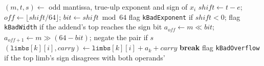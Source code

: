 \documentclass[varwidth=6.2in,border=3pt]{standalone}
\newcommand{\code}[1]{\texttt{#1}}
\begin{document}
\begin{algorithmic}[1]
  \State $(m, t, s) \gets$ odd mantissa, true-ulp exponent and sign of $x_i$ 
  \State $\mathit{shift} \gets t - e$;\; $\mathit{off} \gets \lfloor \mathit{shift}/64 \rfloor$;\; $\mathit{bit} \gets \mathit{shift} \bmod 64$
  \State flag \code{kBadExponent} if $\mathit{shift} < 0$; flag \code{kBadWidth} if the addend's top reaches the sign bit
  \State $a_{\mathit{off}} \gets m \ll \mathit{bit}$;\; $a_{\mathit{off}+1} \gets m \gg (64 - \mathit{bit})$;\; negate the pair if $s$ 
   
    \State $(\code{limbs}[k][i], \mathit{carry}) \gets \code{limbs}[k][i] + a_k + \mathit{carry}$
     \textbf{break} \EndIf
  \EndFor
  \State flag \code{kBadOverflow} if the top limb's sign disagrees with both operands'
\EndFor
\end{algorithmic}
\end{document}
